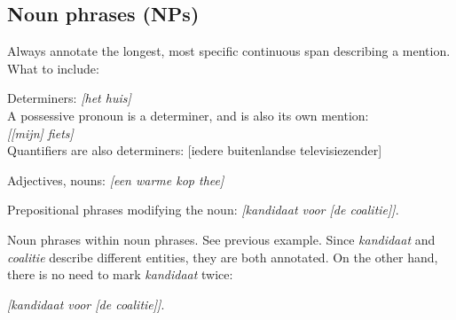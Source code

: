 \subsection{Noun phrases (NPs)}
Always annotate the longest, most specific
continuous span describing a mention. What to include:
\begin{itemize*}
    \item Determiners: \emph{[het huis]} \\
        A possessive pronoun is a determiner,
        and is also its own mention:\\
            \emph{[[mijn] fiets]}\\
        Quantifiers are also determiners: [iedere buitenlandse televisiezender]
    \item Adjectives, nouns: \emph{[een warme kop thee]}
    \item Prepositional phrases modifying the noun:
        \emph{[kandidaat voor [de coalitie]]}.
    \item Noun phrases within noun phrases. See previous example.
        Since \emph{kandidaat} and \emph{coalitie} describe different
        entities, they are both annotated. On the other hand,
        there is no need to mark \emph{kandidaat} twice:

        \emph{[\n{[}kandidaat\n{]} voor [de coalitie]]}.

\end{itemize*}

